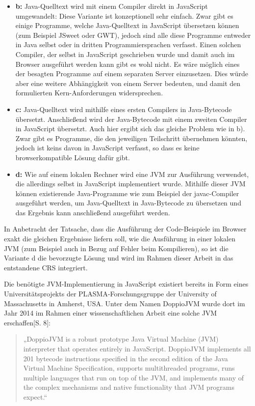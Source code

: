 \begin{itemize}
    \item \textbf{b:} Java-Quelltext wird mit einem Compiler direkt in JavaScript umgewandelt: Diese Variante ist konzeptionell sehr einfach. Zwar gibt es einige Programme, welche Java-Quelltext in JavaScript übersetzen können (zum Beispiel JSweet oder GWT), jedoch sind alle diese Programme entweder in Java selbst oder in dritten Programmiersprachen verfasst. Einen solchen Compiler, der selbst in JavaScript geschrieben wurde und damit auch im Browser ausgeführt werden kann gibt es wohl nicht. Es wäre möglich eines der besagten Programme auf einem separaten Server einzusetzen. Dies würde aber eine weitere Abhängigkeit von einem Server bedeuten, und damit den formulierten Kern-Anforderungen widersprechen.
    \item \textbf{c:} Java-Quelltext wird mithilfe eines ersten Compilers in Java-Bytecode übersetzt. Anschließend wird der Java-Bytecode mit einem zweiten Compiler in JavaScript übersetzt. Auch hier ergibt sich das gleiche Problem wie in b). Zwar gibt es Programme, die den jeweiligen Teilschritt übernehmen könnten, jedoch ist keins davon in JavaScript verfasst, so dass es keine browserkompatible Lösung dafür gibt.
    \item \textbf{d:} Wie auf einem lokalen Rechner wird eine JVM zur Ausführung verwendet, die allerdings selbst in JavaScript implementiert wurde. Mithilfe dieser JVM können existierende Java-Programme wie zum Beispiel der javac-Compiler ausgeführt werden, um Java-Quelltext in Java-Bytecode zu übersetzen und das Ergebnis kann anschließend ausgeführt werden.
\end{itemize}

In Anbetracht der Tatsache, dass die Ausführung der Code-Beispiele im Browser exakt die gleichen Ergebnisse liefern soll, wie die Ausführung in einer lokalen JVM (zum Beispiel auch in Bezug auf Fehler beim Kompilieren), so ist die Variante d die bevorzugte Lösung und wird im Rahmen dieser Arbeit in das entstandene CRS integriert.

Die benötigte JVM-Implementierung in JavaScript existiert bereits in Form eines Universitätsprojekts der PLASMA-Forschungsgruppe der University of Massachusetts in Amherst, USA. Unter dem Namen DoppioJVM wurde dort im Jahr 2014 im Rahmen einer wissenschaftlichen Arbeit eine solche JVM erschaffen\cite{paper:doppio}[S. 8]:

\begin{quotation}
„DoppioJVM is a robust prototype Java Virtual Machine (JVM) interpreter
that operates entirely in JavaScript. DoppioJVM implements all 201 bytecode instructions specified in the second edition of the Java Virtual Machine Specification, supports multithreaded programs, runs multiple languages that run on top of the JVM, and implements many of the complex mechanisms and native functionality that JVM programs expect.“
\end{quotation}

